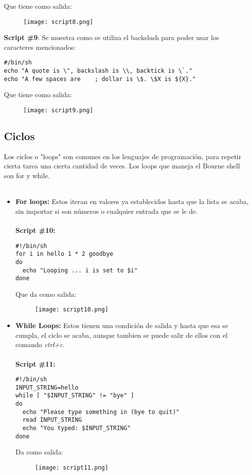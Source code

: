 \documentclass[a4paper]{article}
\begin{document}
Que tiene como salida:
\begin{figure}[h!]
  \texttt{[image: script8.png]}
  \centering
  \label{fig:21}
\end{figure}

\textbf{Script \#9}: Se muestra como se utiliza el backslash para poder usar los caracteres mencionados:
 \begin{verbatim}
#/bin/sh
echo "A quote is \", backslash is \\, backtick is \`."
echo "A few spaces are    ; dollar is \$. \$X is ${X}."
 \end{verbatim}
Que tiene como salida:
 \begin{figure}[h!]
  \texttt{[image: script9.png]}
  \centering
  \label{fig:22}
\end{figure}

\subsection{Ciclos}

Los ciclos o "loops" son comunes en los lenguajes de programación, para repetir cierta tarea una cierta cantidad de veces. Los loops que maneja el Bourne shell son for y while.\\
\\

\begin{itemize}
\item \textbf{For loops:} Estos iteran en valores ya establecidos hasta que la lista se acaba, sin importar si son números o cualquier entrada que se le de. \\
\\
\textbf{Script \#10:} 
\begin{verbatim}
#!/bin/sh
for i in hello 1 * 2 goodbye 
do
  echo "Looping ... i is set to $i"
done
\end{verbatim}

Que da como salida:
 \begin{figure}[h!]
  \texttt{[image: script10.png]}
  \centering
  \label{fig:23}
\end{figure}

\item \textbf{While Loops:} Estos tienen una condición de salida y hasta que esa se cumpla, el ciclo se acaba, aunque tambien se puede salir de ellos con el comando \textit{ctrl+c}.\\
\\
\textbf{Script \#11:} 
\begin{verbatim}
#!/bin/sh
INPUT_STRING=hello
while [ "$INPUT_STRING" != "bye" ]
do
  echo "Please type something in (bye to quit)"
  read INPUT_STRING
  echo "You typed: $INPUT_STRING"
done
\end{verbatim}

Da como salida:
 \begin{figure}[h!]
  \texttt{[image: script11.png]}
  \centering
  \label{fig:24}
\end{figure}
\end{itemize}
\end{document}
